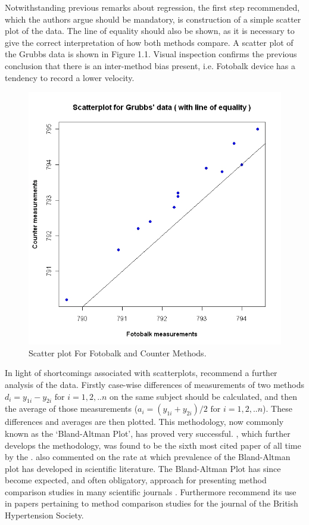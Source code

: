 \documentclass[Main.tex]{subfiles}
\begin{document}
	Notwithstanding previous remarks about regression, the first step
	recommended, which the authors argue should be mandatory, is
	construction of a simple scatter plot of the data. The line of
	equality should also be shown, as it is necessary to give the
	correct interpretation of how both methods compare. A scatter plot
	of the Grubbs data is shown in Figure 1.1. Visual inspection confirms the previous conclusion that there is an
	inter-method bias present, i.e. Fotobalk device has a tendency to
	record a lower velocity.
	
	\begin{figure}[h!]
		\begin{center}
			\includegraphics[width=130mm]{images/GrubbsScatter.jpeg}
			\caption{Scatter plot For Fotobalk and Counter Methods.}\label{GrubbsScatter}
		\end{center}
	\end{figure}
	
	In light of shortcomings associated with scatterplots,
	\citet*{BA83} recommend a further analysis of the data. Firstly
	case-wise differences of measurements of two methods $d_{i} =
	y_{1i}-y_{2i} \mbox{ for }i=1,2,..n$ on the same subject should be
	calculated, and then the average of those measurements ($a_{i} =
	(y_{1i} + y_{2i})/2 \mbox{ for }i=1,2,..n$). These differences and
	averages are then plotted. This methodology, now commonly known as
	the `Bland-Altman Plot', has proved very successful.
	\citet*{BA86}, which further develops the methodology, was found
	to be the sixth most cited paper of all time by the
	\citet{BAcite}. \cite{Dewitte} also commented on the rate at which
	prevalence of the Bland-Altman plot has developed in scientific
	literature. The Bland-Altman Plot has since become expected, and
	often obligatory, approach for presenting method comparison
	studies in many scientific journals \citep{hollis}. Furthermore
	\citet{BritHypSoc} recommend its use in papers pertaining to
	method comparison studies for the journal of the British
	Hypertension Society.
	
\end{document}
